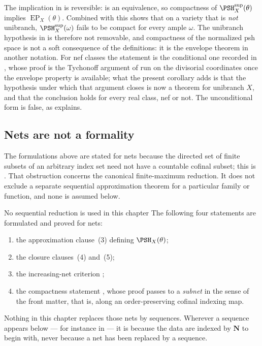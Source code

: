 \begin{remark}
\label{rem:ch45-compactness-equivalent}
The implication in  is reversible:
 is an equivalence, so compactness of
$\PSH^{\sup}_X(\theta)$ implies $\operatorname{EP}_X(\theta)$.  Combined
with  this shows that on a variety that is
\emph{not} unibranch, $\PSH^{\sup}_X(\omega)$ fails to be compact for every
ample $\omega$.  The unibranch hypothesis in
 is therefore not removable, and compactness of
the normalized psh space is not a soft consequence of the definitions: it is
the envelope theorem in another notation.  For nef classes the statement is
the conditional one recorded in ,
whose proof is the Tychonoff argument of \cite[Theorem~5.11]{BJ22} run on
the divisorial coordinates once the envelope property is available; what the
present corollary adds is that the hypothesis under which that argument
closes is now a theorem for unibranch $X$, and that the conclusion holds
for every real class, nef or not.  The unconditional form is false, as
 explains.
\end{remark}

\subsection{Nets are not a formality}
\label{sec:ch45-nets-formality}

The formulations above are stated for nets because the directed set of
finite subsets of an arbitrary index set need not have a countable cofinal
subset; this is .  That obstruction concerns the
canonical finite-maximum reduction.  It does not exclude a separate
sequential approximation theorem for a particular family or function, and
none is assumed below.

\begin{warning}{No sequential reduction is used in this chapter}
\label{warn:ch45-nets}
The following four statements are formulated and proved for nets:
\begin{enumerate}
\item the approximation clause \,(3) defining
      $\PSH_X(\theta)$;
\item the closure clauses \,(4) and~(5);
\item the increasing-net criterion
      ;
\item the compactness statement , whose proof
      passes to a \emph{subnet} in the sense of the front matter, that is,
      along an order-preserving cofinal indexing map.
\end{enumerate}
Nothing in this chapter replaces those nets by sequences.  Wherever a
sequence appears below --- for instance in
 --- it is because the data are
indexed by $\mathbf N$ to begin with, never because a net has been
replaced by a sequence.
\end{warning}

